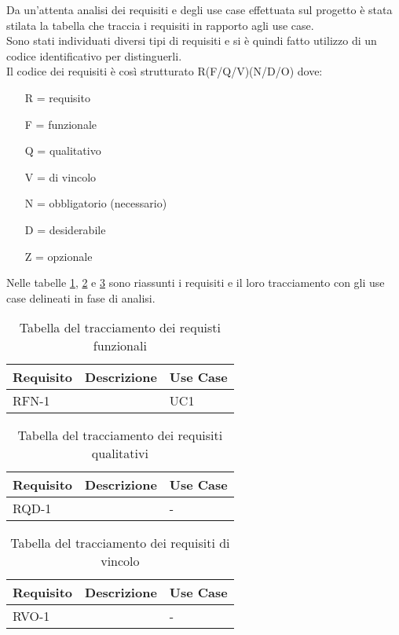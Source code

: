 Da un'attenta analisi dei requisiti e degli use case effettuata sul progetto è stata stilata la tabella che traccia i requisiti in rapporto agli use case.\\
Sono stati individuati diversi tipi di requisiti e si è quindi fatto utilizzo di un codice identificativo per distinguerli.\\
Il codice dei requisiti è così strutturato R(F/Q/V)(N/D/O) dove:
\begin{enumerate}
	\item[R =] requisito
    \item[F =] funzionale
    \item[Q =] qualitativo
    \item[V =] di vincolo
    \item[N =] obbligatorio (necessario)
    \item[D =] desiderabile
    \item[Z =] opzionale
\end{enumerate}
Nelle tabelle \ref{tab:requisiti-funzionali}, \ref{tab:requisiti-qualitativi} e \ref{tab:requisiti-vincolo} sono riassunti i requisiti e il loro tracciamento con gli use case delineati in fase di analisi.

\newpage

\begin{table}%
\caption{Tabella del tracciamento dei requisti funzionali}
\label{tab:requisiti-funzionali}
\begin{tabularx}{\textwidth}{lXl}
\hline\hline
\textbf{Requisito} & \textbf{Descrizione} & \textbf{Use Case}\\
\hline
RFN-1     &  & UC1 \\
\hline
\end{tabularx}
\end{table}%

\begin{table}%
\caption{Tabella del tracciamento dei requisiti qualitativi}
\label{tab:requisiti-qualitativi}
\begin{tabularx}{\textwidth}{lXl}
\hline\hline
\textbf{Requisito} & \textbf{Descrizione} & \textbf{Use Case}\\
\hline
RQD-1    &  & - \\
\hline
\end{tabularx}
\end{table}%

\begin{table}%
\caption{Tabella del tracciamento dei requisiti di vincolo}
\label{tab:requisiti-vincolo}
\begin{tabularx}{\textwidth}{lXl}
\hline\hline
\textbf{Requisito} & \textbf{Descrizione} & \textbf{Use Case}\\
\hline
RVO-1    &  & - \\
\hline
\end{tabularx}
\end{table}%